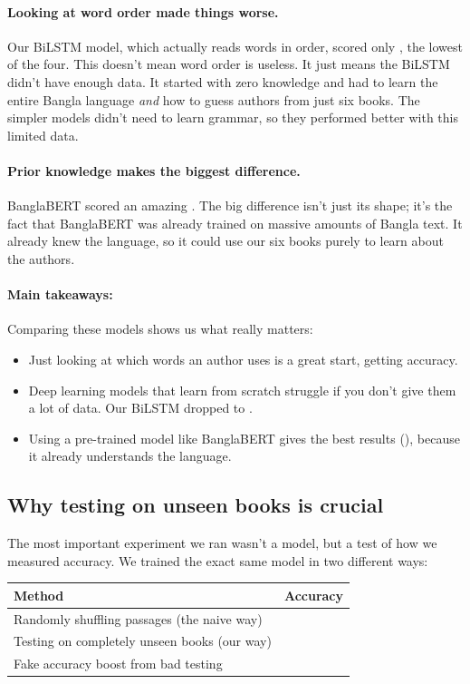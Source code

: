 \paragraph{Looking at word order made things worse.} Our BiLSTM model, which actually reads words in order, scored only \bilstmAcc{}, the lowest of the four. This doesn't mean word order is useless. It just means the BiLSTM didn't have enough data. It started with zero knowledge and had to learn the entire Bangla language \emph{and} how to guess authors from just six books. The simpler models didn't need to learn grammar, so they performed better with this limited data.

\paragraph{Prior knowledge makes the biggest difference.} BanglaBERT scored an amazing \bertFTAcc{}. The big difference isn't just its shape; it's the fact that BanglaBERT was already trained on massive amounts of Bangla text. It already knew the language, so it could use our six books purely to learn about the authors.

\paragraph{Main takeaways:}
Comparing these models shows us what really matters:
\begin{itemize}
  \item Just looking at which words an author uses is a great start, getting \naiveBayesAcc{} accuracy.
  \item Deep learning models that learn from scratch struggle if you don't give them a lot of data. Our BiLSTM dropped to \bilstmAcc{}.
  \item Using a pre-trained model like BanglaBERT gives the best results (\bertFTAcc{}), because it already understands the language.
\end{itemize}

\subsection{Why testing on unseen books is crucial}

The most important experiment we ran wasn't a model, but a test of how we measured accuracy. We trained the exact same model in two different ways:

\begin{center}\small
\begin{tabular}{lr}
\toprule
\textbf{Method} & \textbf{Accuracy} \\
\midrule
Randomly shuffling passages (the naive way) & \randomSplitAcc{} \\
Testing on completely unseen books (our way) & \workSplitAcc{} \\
\midrule
Fake accuracy boost from bad testing & \leakGap{} \\
\bottomrule
\end{tabular}
\end{center}

